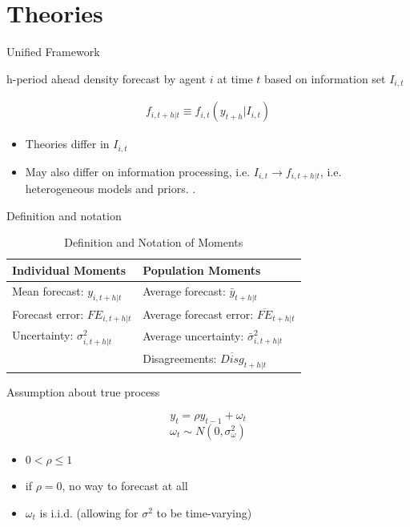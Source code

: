 \documentclass{beamer}
\begin{document}
\section{Theories}

\begin{frame}{Unified Framework}

h-period ahead density forecast by agent $i$ at time $t$ based on information set $I_{i,t}$

\begin{eqnarray*}
	f_{i,t+h|t} \equiv f_{i,t}(y_{t+h}|I_{i,t})
\end{eqnarray*}

\begin{itemize}
	\item Theories differ in $I_{i,t}$
	\item May also differ on information processing, i.e. $I_{i,t} \rightarrow f_{i,t+h|t}$, i.e. heterogeneous models and priors. \citet{patton2010forecasters}.
\end{itemize}

\end{frame}


\begin{frame}{Definition and notation}
	\begin{table}[ht]
	\centering
	\caption{Definition and Notation of Moments}
	\label{MomSum}
	\begin{tabular}{ll}
		
		\hline 
		Individual Moments                                  & Population Moments                             \\
		\hline 
		Mean forecast: $y_{i,t+h|t}$                   & Average forecast: $\bar y_{t+h|t}$                   \\
		Forecast error: $FE_{i,t+h|t}$ & Average forecast error: $\overline{FE}_{t+h|t}$ \\
		Uncertainty: $\sigma^2_{i,t+h|t}$         & Average uncertainty:  $\bar \sigma^2_{i,t+h|t}$ \\
		& Disagreements:  $\overline{Disg}_{t+h|t}$       \\
		\hline 
	\end{tabular}
\end{table}

\end{frame}


\begin{frame}{Assumption about true process}

$$y_{t} = \rho y_{t-1} + \omega_t  $$ 
$$\omega_t \sim N(0,\sigma^2_{\omega})$$

\begin{itemize}
	\item $0 < \rho \leq 1$
	\item if $\rho =0$, no way to forecast at all
	\item $\omega_t$ is i.i.d. (allowing for $\sigma^2$ to be time-varying) 
\end{itemize}

\end{frame}
\end{document}
